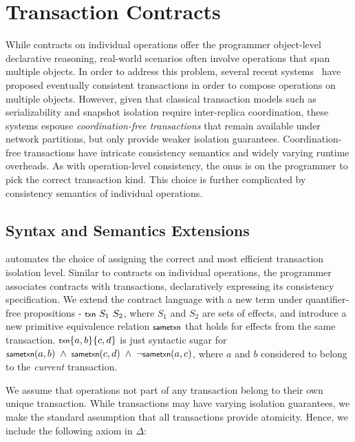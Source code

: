 \section{Transaction Contracts}
\label{sec:txns}

While contracts on individual operations offer the programmer object-level
declarative reasoning, real-world scenarios often involve operations that span
multiple objects. In order to address this problem, several recent
systems~\cite{Walter,Burckhardt2012,BailisHAT} have proposed eventually
consistent transactions in order to compose operations on multiple objects.
However, given that classical transaction models such as serializability and
snapshot isolation require inter-replica coordination, these systems espouse
\emph{coordination-free transactions} that remain available under network
partitions, but only provide weaker isolation guarantees. Coordination-free
transactions have intricate consistency semantics and widely varying runtime
overheads. As with operation-level consistency, the onus is on the programmer
to pick the correct transaction kind. This choice is further complicated by
consistency semantics of individual operations.

\subsection{Syntax and Semantics Extensions}
\label{sec:syn_sem_ext}

\name automates the choice of assigning the correct and most efficient
transaction isolation level. Similar to contracts on individual operations, the
programmer associates contracts with transactions, declaratively expressing its
consistency specification. We extend the contract language with a new term
under quantifier-free propositions - ${\small \txnZ}~S_1~S_2$, where $S_1$ and
$S_2$ are sets of effects, and introduce a new primitive equivalence relation
$\small \sametxnZ$ that holds for effects from the same transaction. $\small
\txn{a,b}{c,d}$ is just syntactic sugar for $\small \sametxn{a}{b} ~\wedge~
\sametxn{c}{d} ~\wedge~ \neg\sametxn{a}{c}$, where $a$ and $b$ considered to
belong to the \emph{current} transaction.

We assume that operations not part of any transaction belong to their own
unique transaction. While transactions may have varying isolation guarantees,
we make the standard assumption that all transactions provide atomicity. Hence,
we include the following axiom in $\Delta$:

